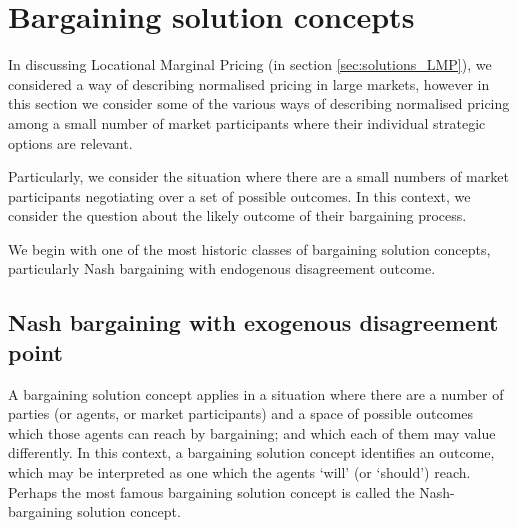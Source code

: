 \section{Bargaining solution concepts}\label{sec:solutions_bargaining}

In discussing Locational Marginal Pricing (in section \ref{sec:solutions_LMP}), we considered a way of describing normalised pricing in large markets, however in this section we consider some of the various ways of describing normalised pricing among a small number of market participants where their individual strategic options are relevant.

Particularly, we consider the situation where there are a small numbers of market participants negotiating over a set of possible outcomes.
In this context, we consider the question about the likely outcome of their bargaining process.


We begin with one of the most historic classes of bargaining solution concepts, particularly Nash bargaining with endogenous disagreement outcome.

\subsection{Nash bargaining with exogenous disagreement point}\label{sec:nash_bargaining_exogenous}




A bargaining solution concept applies in a situation where there are a number of parties (or agents, or market participants) and a space of possible outcomes which those agents can reach by bargaining; and which each of them may value differently.
In this context, a bargaining solution concept identifies an outcome, which may be interpreted as one which the agents `will' (or `should') reach.
Perhaps the most famous bargaining solution concept is called the Nash-bargaining solution concept.

